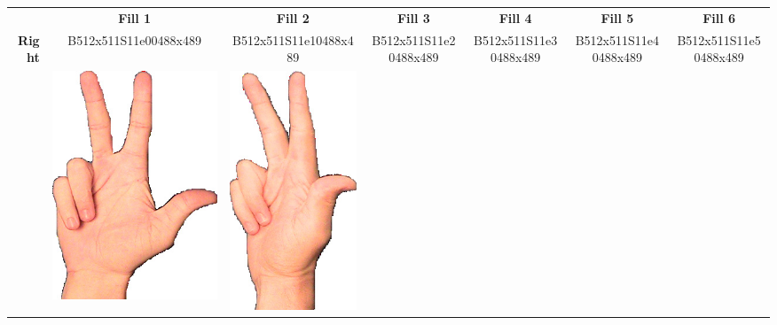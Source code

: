 \documentclass{article}
\begin{document}
\begin{center}
\begin{tabular}{r*{6}{c}}
&\textbf{Fill 1}&\textbf{Fill 2}&\textbf{Fill 3}&\textbf{Fill 4}&\textbf{Fill 5}&\textbf{Fill 6}\\
\multirow{2}{*}{\textbf{Right}}&
B512x511S11e00488x489&
B512x511S11e10488x489&
B512x511S11e20488x489&
B512x511S11e30488x489&
B512x511S11e40488x489&
B512x511S11e50488x489\\
&
\includegraphics[scale=0.1]{images/03-01-1.jpg}&
\includegraphics[scale=0.1]{images/03-01-2.jpg}&

\end{tabular}
\end{center}
\end{document}
